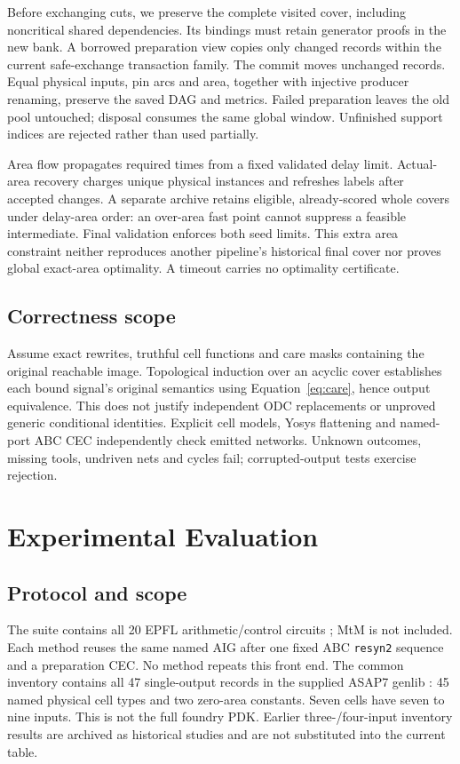 \documentclass[conference]{IEEEtran}
\begin{document}
Before exchanging cuts, we preserve the complete visited cover, including
noncritical shared dependencies. Its bindings must retain generator
proofs in the new bank. A borrowed preparation view copies only changed records within the current safe-exchange transaction family. The commit moves unchanged records.
Equal physical inputs, pin arcs and area, together with injective producer
renaming, preserve the saved DAG and metrics. Failed preparation leaves
the old pool untouched; disposal consumes the same global window.
Unfinished support indices are rejected rather than used partially.

Area flow propagates required times from a fixed validated delay limit.
Actual-area recovery charges unique physical instances and refreshes
labels after accepted changes. A separate archive retains eligible,
already-scored whole covers under delay-area order: an over-area fast
point cannot suppress a feasible intermediate. Final validation enforces
both seed limits. This extra area constraint neither reproduces another
pipeline's historical final cover nor proves global exact-area optimality.
A timeout carries no optimality certificate.

\subsection{Correctness scope}
Assume exact rewrites, truthful cell functions and care masks containing
the original reachable image. Topological induction over an acyclic
cover establishes each bound signal's original semantics using
Equation~\eqref{eq:care}, hence output equivalence. This does not justify
independent ODC replacements or unproved generic conditional identities.
Explicit cell models, Yosys flattening and named-port ABC CEC
\cite{abc} independently check emitted networks. Unknown outcomes,
missing tools, undriven nets and cycles fail; corrupted-output tests
exercise rejection.

\section{Experimental Evaluation}
\subsection{Protocol and scope}
The suite contains all 20 EPFL arithmetic/control circuits \cite{epfl}; MtM is not included.
Each method reuses the same named AIG after one fixed ABC \texttt{resyn2} sequence and a preparation CEC. No method repeats this front end.
The common inventory contains all 47 single-output records in the supplied ASAP7 genlib \cite{asap7}: 45 named physical cell types and two zero-area constants. Seven cells have seven to nine inputs. This is not the full foundry PDK.
Earlier three-/four-input inventory results are archived as historical studies and are not substituted into the current table.
\end{document}
